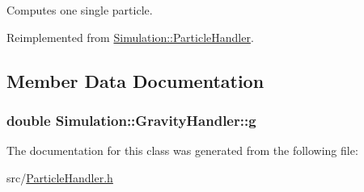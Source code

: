 Computes one single particle. 



Reimplemented from \hyperlink{classSimulation_1_1ParticleHandler_a6b1fc310603bc10093d50c674097fd25}{Simulation\-::\-Particle\-Handler}.



\subsection{Member Data Documentation}
\hypertarget{classSimulation_1_1GravityHandler_ad4a9911ae16b09fb2be6d50424efbeee}{
\subsubsection[{g}]{\setlength{\rightskip}{0pt plus 5cm}double Simulation\-::\-Gravity\-Handler\-::g\hspace{0.3cm}{\ttfamily [private]}}}\label{classSimulation_1_1GravityHandler_ad4a9911ae16b09fb2be6d50424efbeee}


The documentation for this class was generated from the following file\-:\begin{DoxyCompactItemize}
\item 
src/\hyperlink{ParticleHandler_8h}{Particle\-Handler.\-h}\end{DoxyCompactItemize}
